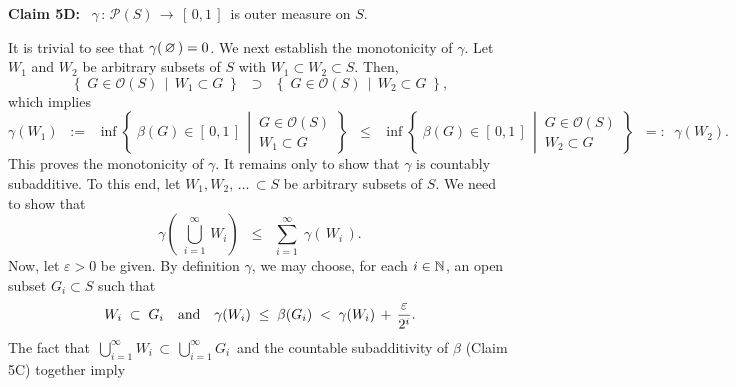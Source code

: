 \vskip 0.2cm
\begin{center}
\begin{minipage}{6.5in}
\textbf{Claim 5D:} \,
$\gamma \,:\, \mathcal{P}(S) \,\longrightarrow\, [\,0,1\,]$\, is outer measure on $S$.
\end{minipage}
\end{center}
It is trivial to see that $\gamma(\,\varnothing\,) = 0$.
We next establish the monotonicity of $\gamma$.
Let $W_{1}$ and $W_{2}$ be arbitrary subsets of $S$ with $W_{1} \subset W_{2} \subset S$.
Then,
\begin{equation*}
\left\{\;G \in \mathcal{O}(S) \,\;\vert\,\; W_{1} \subset G\;\right\}
\;\; \supset \;\;
\left\{\;G \in \mathcal{O}(S) \,\;\vert\,\; W_{2} \subset G\;\right\},
\end{equation*}
which implies
\begin{equation*}
\gamma(W_{1}) \;\; := \;\;
\inf\left\{\;\beta(G) \in [\,0,1\,] \,\;\left\vert\, \begin{array}{c} G \in \mathcal{O}(S) \\ W_{1} \subset G \end{array}\right.\right\}
\;\; \leq \;\;
\inf\left\{\;\beta(G) \in [\,0,1\,] \,\;\left\vert\, \begin{array}{c} G \in \mathcal{O}(S) \\ W_{2} \subset G \end{array}\right.\right\}
\;\; =: \;\; \gamma(W_{2}).
\end{equation*}
This proves the monotonicity of $\gamma$.
It remains only to show that $\gamma$ is countably subadditive.
To this end, let $W_{1}, W_{2}, \,\ldots\, \subset S$ be arbitrary subsets of $S$.
We need to show that
\begin{equation*}
\gamma\!\left(\;\bigcup_{i=1}^{\infty}\,W_{i}\right)
\;\;\leq\;\; \overset{\infty}{\underset{i=1}{\sum}}\;\gamma\!\left(\,W_{i}\,\right).
\end{equation*}
Now, let $\varepsilon > 0$ be given.
By definition $\gamma$, we may choose, for each $i \in \mathbb{N}$, an open subset $G_{i} \subset S$ such that
\begin{equation*}
W_{i} \;\subset\; G_{i}
\quad\textnormal{and}\quad
\gamma(W_{i}) \; \leq \; \beta(G_{i}) \;<\; \gamma(W_{i}) \,+\, \dfrac{\varepsilon}{2^{i}}.
\end{equation*}
The fact that \,$\bigcup_{i=1}^{\infty}W_{i} \,\subset\, \bigcup_{i=1}^{\infty}G_{i}$\,
and the countable subadditivity of $\beta$ (Claim 5C) together imply
